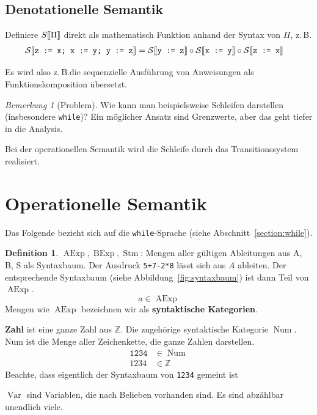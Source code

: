 \documentclass[a4paper,12pt]{article}
\theoremstyle{definition}
\newtheorem{definition}{Definition}[section]
\theoremstyle{plain}
\theoremstyle{remark}
\newtheorem*{remark}{Bemerkung}
\newcommand{\lsem}{\mathrm{[}\kern-.14em\mathrm{[}}
\newcommand{\rsem}{\mathrm{]}\kern-.14em\mathrm{]}}
\newcommand{\zb}{z.\,B.\;}
\newcommand{\sem}[1]{S\lsem#1\rsem}
\newcommand{\Ssem}[1]{\mathcal{S}\lsem#1\rsem}
\newcommand{\figref}[1]{Abbildung~\ref{#1}}
\newcommand{\secref}[1]{Abschnitt~\ref{#1}}
\DeclareMathOperator{\AExp}{AExp}
\DeclareMathOperator{\BExp}{BExp}
\DeclareMathOperator{\Stm}{Stm}
\DeclareMathOperator{\Num}{Num}
\DeclareMathOperator{\Var}{Var}
\begin{document}
\subsection{Denotationelle Semantik}

Definiere $\sem{\Pi}$ direkt als mathematisch Funktion anhand der Syntax von $\Pi$, \zb
\begin{align*}
    \Ssem{\texttt{z := x; x := y; y := z}} & = \Ssem{\texttt{y := z}} \circ \Ssem{\texttt{x := y}} \circ \Ssem{\texttt{z := x}}
\end{align*}

Es wird also \zb die sequenzielle Ausführung von Anweisungen als Funktionskomposition übersetzt.

\begin{remark}[Problem]
    Wie kann man beispielsweise Schleifen darstellen (insbesondere \texttt{while})? Ein möglicher Ansatz sind Grenzwerte, aber das geht tiefer in die Analysis.

    Bei der operationellen Semantik wird die Schleife durch das Transitionssystem realisiert.
\end{remark}



\newpage
\section{Operationelle Semantik}

Das Folgende bezieht sich auf die \texttt{while}-Sprache (siehe \secref{section:while}).

\begin{definition}
    $\AExp, \BExp, \Stm$: Mengen aller gültigen Ableitungen aus A, B, S als Syntaxbaum. Der Ausdruck \texttt{5+7-2*8} lässt sich aus $A$ ableiten. Der entsprechende Syntaxbaum (siehe \figref{fig:syntaxbaum}) ist dann Teil von $\AExp$.
    $$a \in \AExp$$
    Mengen wie $\AExp$ bezeichnen wir als \textbf{syntaktische Kategorien}.

    \textbf{Zahl} ist eine ganze Zahl aus $\mathbb{Z}$. Die zugehörige syntaktische Kategorie $\Num$. Num ist die Menge aller Zeichenkette, die ganze Zahlen darstellen.
    \begin{align*}
        \texttt{1234} & \in \Num \\
        1234 & \in \mathbb{Z}
    \end{align*}
    Beachte, dass eigentlich der Syntaxbaum von \texttt{1234} gemeint ist

    $\Var$ sind Variablen, die nach Belieben vorhanden sind. Es sind abzählbar unendlich viele.
\end{definition}
\end{document}
